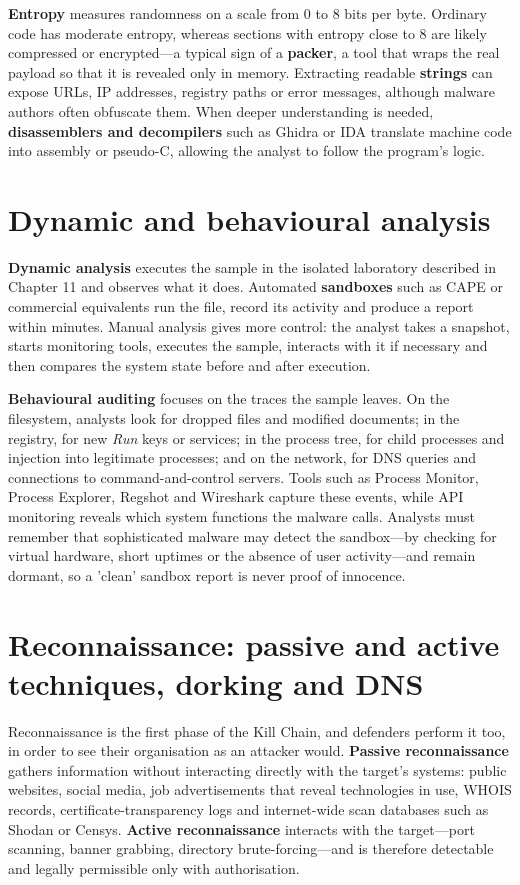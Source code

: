 \documentclass[11pt,openany]{book}
\begin{document}
\textbf{Entropy} measures randomness on a scale from 0 to 8 bits per byte. Ordinary code has moderate entropy, whereas sections with entropy close to 8 are likely compressed or encrypted—a typical sign of a \textbf{packer}, a tool that wraps the real payload so that it is revealed only in memory. Extracting readable \textbf{strings} can expose URLs, IP addresses, registry paths or error messages, although malware authors often obfuscate them. When deeper understanding is needed, \textbf{disassemblers and decompilers} such as Ghidra or IDA translate machine code into assembly or pseudo-C, allowing the analyst to follow the program's logic.

\section{Dynamic and behavioural analysis}\label{sec:12.2}
\textbf{Dynamic analysis} executes the sample in the isolated laboratory described in Chapter 11 and observes what it does. Automated \textbf{sandboxes} such as CAPE or commercial equivalents run the file, record its activity and produce a report within minutes. Manual analysis gives more control: the analyst takes a snapshot, starts monitoring tools, executes the sample, interacts with it if necessary and then compares the system state before and after execution.

\textbf{Behavioural auditing} focuses on the traces the sample leaves. On the filesystem, analysts look for dropped files and modified documents; in the registry, for new \emph{Run} keys or services; in the process tree, for child processes and injection into legitimate processes; and on the network, for DNS queries and connections to command-and-control servers. Tools such as Process Monitor, Process Explorer, Regshot and Wireshark capture these events, while API monitoring reveals which system functions the malware calls. Analysts must remember that sophisticated malware may detect the sandbox—by checking for virtual hardware, short uptimes or the absence of user activity—and remain dormant, so a 'clean' sandbox report is never proof of innocence.

\section{Reconnaissance: passive and active techniques, dorking and DNS}\label{sec:12.3}
Reconnaissance is the first phase of the Kill Chain, and defenders perform it too, in order to see their organisation as an attacker would. \textbf{Passive reconnaissance} gathers information without interacting directly with the target's systems: public websites, social media, job advertisements that reveal technologies in use, WHOIS records, certificate-transparency logs and internet-wide scan databases such as Shodan or Censys. \textbf{Active reconnaissance} interacts with the target—port scanning, banner grabbing, directory brute-forcing—and is therefore detectable and legally permissible only with authorisation.
\end{document}
